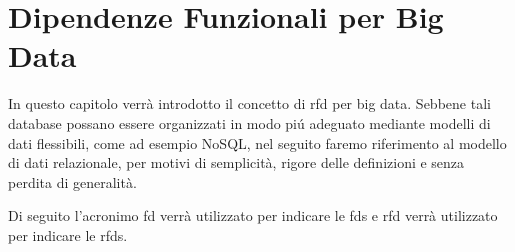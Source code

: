 \chapter{Dipendenze Funzionali per Big Data}
\label{cap3:fd}
In questo capitolo verr\`{a} introdotto il concetto di \acrlong{rfd} per big data. Sebbene tali database possano essere organizzati in modo pi\'{u} adeguato mediante modelli di dati flessibili, come ad esempio NoSQL, nel seguito faremo riferimento al modello di dati relazionale, per motivi di semplicit\`{a}, rigore delle definizioni e senza perdita di generalit\`{a}.\par
Di seguito l'acronimo \acrshort{fd} verr\`{a} utilizzato per indicare le \acrlong{fds} e \acrshort{rfd} verr\`{a} utilizzato per indicare le \acrlong{rfds}.

